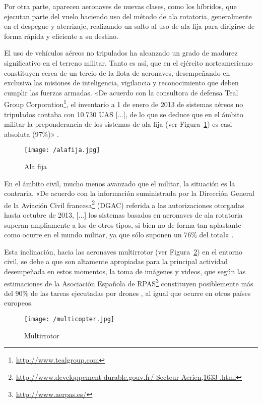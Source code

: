 Por otra parte, aparecen aeronaves de nuevas clases, como los híbridos, que ejecutan parte del vuelo haciendo uso del método de ala rotatoria, generalmente en el despegue y aterrizaje, realizando un salto al uso de ala fija para dirigirse de forma rápida y eficiente a su destino.

El uso de vehículos aéreos no tripulados ha alcanzado un grado de madurez significativo en el terreno militar. Tanto es así, que 
en el ejército norteamericano constituyen cerca de un tercio de la flota de aeronaves, desempeñando en exclusiva las misiones 
de inteligencia, vigilancia y reconocimiento que deben cumplir las fuerzas armadas. «De acuerdo con la consultora de defensa Teal Group Corporation\footnote{\url{http://www.tealgroup.com}}, el inventario a 1 de enero de 2013 de sistemas aéreos no tripulados contaba con 10.730 \acs{UAS} [...], de lo que se deduce que en el ámbito militar la preponderancia de los sistemas de ala fija (ver Figura~\ref{fig:alafija}) es casi absoluta (97\%)» \cite{dron2}.


\begin{figure}[!h]
\begin{center}
\texttt{[image: /alafija.jpg]}
\caption[Caption]{Ala fija}
\label{fig:alafija}
\end{center}
\end{figure}

En el ámbito civil, mucho menos avanzado que el militar, la situación es la contraria. «De acuerdo con la información suministrada por la Dirección General de la Aviación Civil francesa\footnote{\url{http://www.developpement-durable.gouv.fr/-Secteur-Aerien,1633-.html}} (DGAC) referida a las autorizaciones otorgadas hasta octubre de 2013, [...] los sistemas basados en aeronaves de ala rotatoria superan ampliamente
a los de otros tipos, si bien no de forma tan aplastante como ocurre en el mundo militar, ya que sólo suponen un 76\% del total» \cite{dron2}.

Esta inclinación, hacia las aeronaves multirrotor (ver Figura~\ref{fig:multirrotor}) en el entorno civil, se debe a que son altamente apropiadas para la principal actividad desempeñada en estos momentos, la toma de imágenes y videos, que según las estimaciones de la Asociación Española de RPAS\footnote{\url{http://www.aerpas.es/}} constituyen posiblemente más del 90\% de las tareas ejecutadas por drones \cite{AERPAS}, al igual que ocurre en otros países europeos.

\begin{figure}[!h]
\begin{center}
\texttt{[image: /multicopter.jpg]}
\caption[Caption]{Multirrotor}
\label{fig:multirrotor}
\end{center}
\end{figure}

